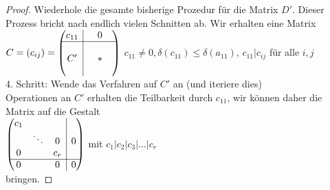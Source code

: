 \documentclass[10pt,a4paper,numbers=endperiod]{scrartcl}
\theoremstyle{definition}
\begin{document}
\begin{proof}
	Wiederhole die gesamte bisherige Prozedur für die Matrix $D'$. Dieser Prozess bricht nach endlich vielen Schnitten ab. Wir erhalten eine Matrix\\
	
	$C = (c_{ij}) = \begin{pmatrix}
	\multicolumn{1}{c|}{c_{11}}& & 0 &\\
	\hline
	\multicolumn{1}{c|}{}& & &\\
	\multicolumn{1}{c|}{C'}& & * &\\
	\multicolumn{1}{c|}{}& & &\\
	\end{pmatrix}$ $c_{11} \neq 0, \delta(c_{11}) \leq \delta(a_{11})$, $c_{11}|c_{ij}$ für alle $i,j$\\
	
	4. Schritt: Wende das Verfahren auf $C'$ an (und iteriere dies)\\
	Operationen an $C'$ erhalten die Teilbarkeit durch $c_{11}$, wir können daher die Matrix auf die Gestalt\\
	
	$\begin{pmatrix}
	c_1 & & & \multicolumn{1}{|c}{}\\
	& \ddots & 0 & \multicolumn{1}{|c}{0}\\
	0 & & c_r & \multicolumn{1}{|c}{}\\
	\hline
	0 & & 0 & \multicolumn{1}{|c}{0}
	\end{pmatrix}$ mit $c_1|c_2|c_3|\ldots|c_r$\\
	bringen.
\end{proof}
\end{document}
